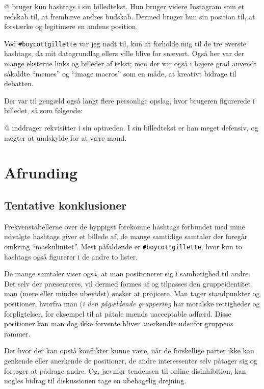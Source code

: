 @\citeauthor{elle_sciencekitty2019} bruger kun hashtags i sin 
billedtekst. Hun bruger videre Instagram som et redskab til, at 
fremhæve andres budskab. Dermed bruger hun sin position til, at 
forstærke og legitimere en andens position.

Ved \texttt{\#boycottgillette} var jeg nødt til, kun at forholde 
mig til de tre øverste hashtags, da mit datagrundlag ellers ville 
blive for snævert. Også her var der mange eksterne links og 
billeder af tekst; men der var også i højere grad anvendt såkaldte 
“memes” og “image macros” som en måde, at kreativt bidrage til 
debatten.

Der var til gengæld også langt flere personlige opslag, hvor 
brugeren figurerede i billedet, så som følgende:



@\citeauthor{david_s1000rr2019} inddrager rekvisitter i sin 
optræden. I sin billedtekst er han meget defensiv, og nægter at 
undskylde for at være mand.

\section{Afrunding}

\subsection{Tentative konklusioner}

Frekvenstabellerne over de hyppigst forekomne hashtags forbundet 
med mine udvalgte hashtags giver et billede af, de mange samtidige 
samtaler der foregår omkring “maskulinitet”. Mest påfaldende er 
\texttt{\#boycottgillette}, hvor kun to hashtags også figurerer i 
de andre to lister.

De mange samtaler viser også, at man positionerer sig i 
samhørighed til andre. Det selv der præsenteres, vil dermed formes 
af og tilpasses den gruppeidentitet man (mere eller mindre 
ubevidst) ønsker at projicere. Man tager standpunkter og 
positioner, hvorfra man (\emph{i den pågældende gruppering} har 
moralske rettigheder og forpligtelser, for eksempel til at påtale 
mænds uacceptable adfærd. Disse positioner kan man dog ikke 
forvente bliver anerkendte udenfor gruppens rammer.

Der hvor der kan opstå konflikter kunne være, når de forskellige 
parter ikke kan genkende eller anerkende de positioner,
de andre interessenter selv påtager sig og forsøger at pådrage 
andre. Og, jævnfør tendensen til online disinhibition, kan nogles 
bidrag til diskussionen tage en ubehagelig drejning.

